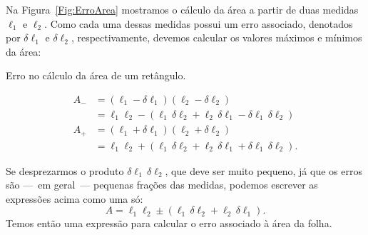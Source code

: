 Na Figura~\ref{Fig:ErroArea} mostramos o cálculo da área a partir de duas medidas $\ell_1$ e $\ell_2$. Como cada uma dessas medidas possui um erro associado, denotados por $\delta\ell_1$ e $\delta\ell_2$, respectivamente, devemos calcular os valores máximos e mínimos da área:
%
\begin{marginfigure}[-2cm]
\centering
{}
\caption{Erro no cálculo da área de um retângulo.}
\label{Fig:ErroArea}
\end{marginfigure}
%
\begin{align}
	A_{-} &= (\ell_1 - \delta\ell_1)(\ell_2 - \delta\ell_2) \\
	&= \ell_1\ell_2 - (\ell_1 \,\delta\ell_2 + \ell_2\,\delta\ell_1 - \delta\ell_1\,\delta\ell_2) \\
	A_{+} &= (\ell_1 + \delta\ell_1)(\ell_2 + \delta\ell_2) \\
	&= \ell_1\ell_2 + (\ell_1 \,\delta\ell_2 + \ell_2\,\delta\ell_1 + \delta\ell_1\,\delta\ell_2).
\end{align}

\noindent{}Se desprezarmos o produto $\delta\ell_1\,\delta\ell_2$, que deve ser muito pequeno, já que os erros são ---~em geral~--- pequenas frações das medidas, podemos escrever as expressões acima como uma só:
\begin{equation}
	A = \ell_1\ell_2 \pm (\ell_1\,\delta\ell_2+\ell_2\,\delta\ell_1).
\end{equation}
%
Temos então uma expressão para calcular o erro associado à área da folha. 

